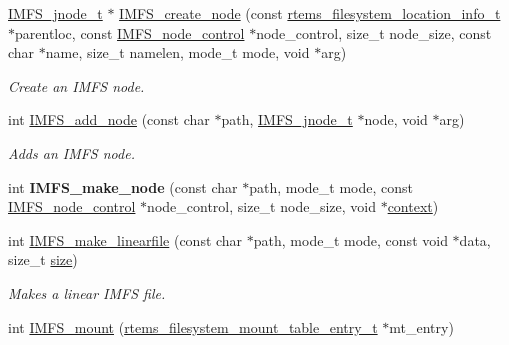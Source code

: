 \begin{DoxyCompactItemize}
\item 
\mbox{\hyperlink{structIMFS__jnode__tt}{I\+M\+F\+S\+\_\+jnode\+\_\+t}} $\ast$ \mbox{\hyperlink{group__IMFS_ga2f5483a637716c1d4f0e10ad01e99d05}{I\+M\+F\+S\+\_\+create\+\_\+node}} (const \mbox{\hyperlink{group__LibIO_ga3252b3d31ee3c49ffff0b7604a676864}{rtems\+\_\+filesystem\+\_\+location\+\_\+info\+\_\+t}} $\ast$parentloc, const \mbox{\hyperlink{structIMFS__node__control}{I\+M\+F\+S\+\_\+node\+\_\+control}} $\ast$node\+\_\+control, size\+\_\+t node\+\_\+size, const char $\ast$name, size\+\_\+t namelen, mode\+\_\+t mode, void $\ast$arg)
\begin{DoxyCompactList}\small\item\em Create an I\+M\+FS node. \end{DoxyCompactList}\item 
int \mbox{\hyperlink{group__IMFS_ga7a9823043f3d3c052fdd0b01c5b86a67}{I\+M\+F\+S\+\_\+add\+\_\+node}} (const char $\ast$path, \mbox{\hyperlink{structIMFS__jnode__tt}{I\+M\+F\+S\+\_\+jnode\+\_\+t}} $\ast$node, void $\ast$arg)
\begin{DoxyCompactList}\small\item\em Adds an I\+M\+FS node. \end{DoxyCompactList}\item 
\mbox{\label{group__IMFS_ga0c48adfe215219e6757c1a1180d1e4e7}} 
int {\bfseries I\+M\+F\+S\+\_\+make\+\_\+node} (const char $\ast$path, mode\+\_\+t mode, const \mbox{\hyperlink{structIMFS__node__control}{I\+M\+F\+S\+\_\+node\+\_\+control}} $\ast$node\+\_\+control, size\+\_\+t node\+\_\+size, void $\ast$\mbox{\hyperlink{sun4u_2tte_8h_a9b4a99475e2709333b8e5d70483173f1}{context}})
\item 
int \mbox{\hyperlink{group__IMFS_ga5ea4b21f4f7767f36b21c146b972124b}{I\+M\+F\+S\+\_\+make\+\_\+linearfile}} (const char $\ast$path, mode\+\_\+t mode, const void $\ast$data, size\+\_\+t \mbox{\hyperlink{sun4u_2tte_8h_a245260f6f74972558f61b85227df5aae}{size}})
\begin{DoxyCompactList}\small\item\em Makes a linear I\+M\+FS file. \end{DoxyCompactList}\item 
\mbox{\label{group__IMFS_ga9e4a2ee4cb144bd1e3dc7dda8b6b549b}} 
int \mbox{\hyperlink{group__IMFS_ga9e4a2ee4cb144bd1e3dc7dda8b6b549b}{I\+M\+F\+S\+\_\+mount}} (\mbox{\hyperlink{structrtems__filesystem__mount__table__entry__tt}{rtems\+\_\+filesystem\+\_\+mount\+\_\+table\+\_\+entry\+\_\+t}} $\ast$mt\+\_\+entry)

\end{DoxyCompactItemize}
